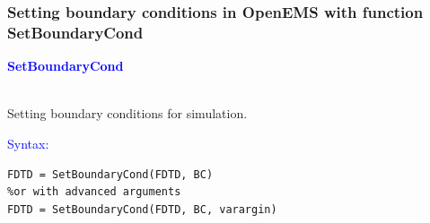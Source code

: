     \subsubsection{Setting boundary conditions in OpenEMS with function SetBoundaryCond}\label{subsubsec:Setting boundary conditions in OpenEMS with function SetBoundaryCond}
	\textcolor{blue}{\begin{large}\textbf{SetBoundaryCond}	\end{large}}\\
	  Setting boundary conditions for simulation.

        \textcolor{blue}{\begin{large}Syntax:\end{large}}
 \begin{lstlisting}
FDTD = SetBoundaryCond(FDTD, BC)
%or with advanced arguments
FDTD = SetBoundaryCond(FDTD, BC, varargin)
 \end{lstlisting}

